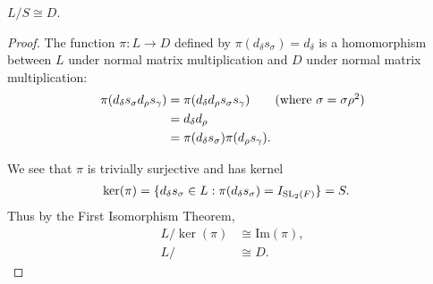 \begin{lemma}
\label{SpecialSubgroups.D_join_S_quot_S_subgroupOf_D_join_S_mulEquiv_D_subgroupOf_D_join_S}
\leanok
    $L / S \cong D$.
\end{lemma}
\begin{proof} 
\leanok
The function $\pi: L \rightarrow D$ defined by $\pi(d_\delta s_\sigma) = d_\delta$ is a homomorphism between $L$ under normal matrix multiplication and $D$ under normal matrix multiplication:
\begin{align*} \pi(d_\delta s_\sigma d_\rho s_\gamma) &= \pi(d_\delta d_\rho s_\sigma s_\gamma) \tag{where $\sigma = \sigma \rho^{2}$}
\\ &= d_\delta d_\rho
\\ &= \pi(d_\delta s_\sigma)\pi(d_\rho s_\gamma).
\end{align*}

We see that $\pi$ is trivially surjective and has kernel
\begin{align*}  \ker(\pi) &= \{ d_\delta s_\sigma \in L : \pi(d_\delta s_\sigma) = I_{\operatorname{SL}_2(F)}\} = S.
\end{align*}
Thus by the First Isomorphism Theorem,
\begin{align*} L / \ker(\pi) &\cong \text{Im}(\pi), \\
L / &\cong D.
\end{align*}
\end{proof}



